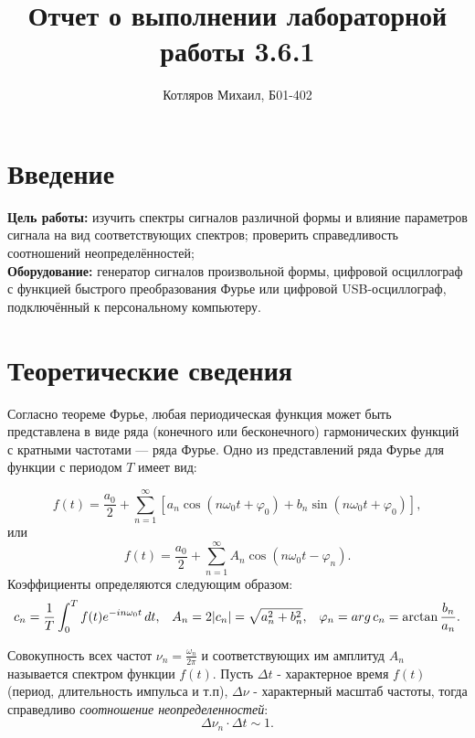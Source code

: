 \documentclass[a4paper]{article}
\title{\textbf{Отчет о выполнении лабораторной работы 3.6.1}}
\date{}
\author{Котляров Михаил, Б01-402}
\begin{document}
\maketitle
	
	\section{Введение}
	
	\textbf{Цель работы:} изучить спектры сигналов различной формы и влияние параметров сигнала на вид соответствующих спектров; проверить справедливость соотношений неопределённостей;\\

	\textbf{Оборудование:} генератор сигналов произвольной формы, цифровой осциллограф с функцией быстрого преобразования Фурье или цифровой USB-осциллограф, подключённый к персональному компьютеру.
	
	\section{Теоретические сведения}

Согласно теореме Фурье, любая периодическая функция может быть представлена в виде ряда (конечного или бесконечного) гармонических функций с кратными частотами — ряда Фурье. Одно из представлений ряда Фурье для функции с периодом $T$ имеет вид:

\begin{equation}
f(t) = \dfrac{a_0}{2} + \sum\limits_{n = 1}^{\infty}\left[a_n \cos \left(n \omega_0t + \varphi_0\right) + b_n \sin \left(n \omega_0t + \varphi_0\right)\right],
\end{equation}
или 
\begin{equation}
f(t) = \dfrac{a_0}{2} + \sum\limits_{n = 1}^{\infty}A_n \cos \left(n\omega_0t-\varphi_n\right).
\end{equation}
Коэффициенты определяются следующим образом:
\begin{align}
c_n &= \displaystyle \frac{1}{T} \int_0^Tf(t)e^{-in\omega_0t} \, dt, & A_n &= 2\abs{c_n} = \sqrt{a_n^2 + b_n^2}, & \varphi_n = arg\, c_n = \arctan{\frac{b_n}{a_n}}.
\end{align}

Совокупность всех частот $\nu_n = \frac{\omega_n}{2\pi}$ и соответствующих им амплитуд $A_n$ называется спектром функции $f(t)$.
Пусть $\Delta t$ - характерное время $f(t)$ (период, длительность импульса и т.п), $\Delta \nu$ - характерный масштаб частоты, тогда справедливо \textit{соотношение неопределенностей}:
\begin{equation}
\Delta \nu_n \cdot \Delta t \sim 1.
\end{equation}
\end{document}
